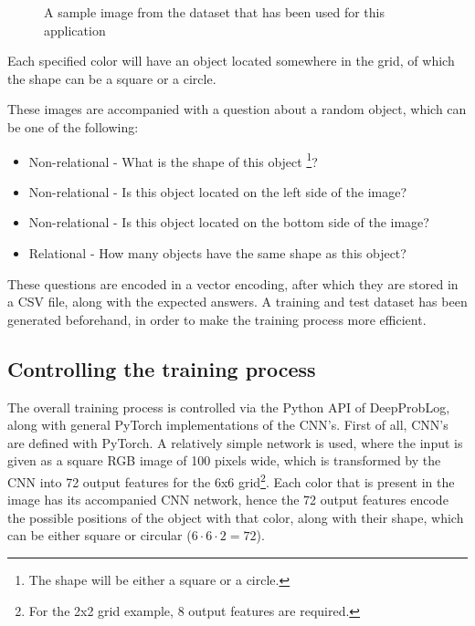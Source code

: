\documentclass[english]{sobraep}
\begin{document}
\begin{figure}[htp]
    \begin{center}
    \captionsetup{justification=centering}
    \caption{A sample image from the dataset that has been used for this application}
    \label{fig:sample_image_own_dataset}
    \end{center}
\end{figure}

Each specified color will have an object located somewhere in the grid, of which the shape can be a square or a circle.

These images are accompanied with a question about a random object, which can be one of the following:
\begin{itemize}
    \item Non-relational - What is the shape of this object \footnote{The shape will be either a square or a circle.}?
    \item Non-relational - Is this object located on the left side of the image?
    \item Non-relational - Is this object located on the bottom side of the image?
    \item Relational - How many objects have the same shape as this object?
\end{itemize}

These questions are encoded in a vector encoding, after which they are stored in a CSV file, along with the expected answers. A training and test dataset has been generated beforehand, in order to make the training process more efficient. 

\subsection{Controlling the training process}
The overall training process is controlled via the Python API of DeepProbLog, along with general PyTorch implementations of the CNN's.
First of all, CNN's are defined with PyTorch. A relatively simple network is used, where the input is given as a square RGB image of 100 pixels wide, which is transformed by the CNN into 72 output features for the 6x6 grid\footnote{For the 2x2 grid example, 8 output features are required.}. Each color that is present in the image has its accompanied CNN network, hence the 72 output features encode the possible positions of the object with that color, along with their shape, which can be either square or circular ($6 \cdot 6 \cdot 2 = 72$).
\end{document}
